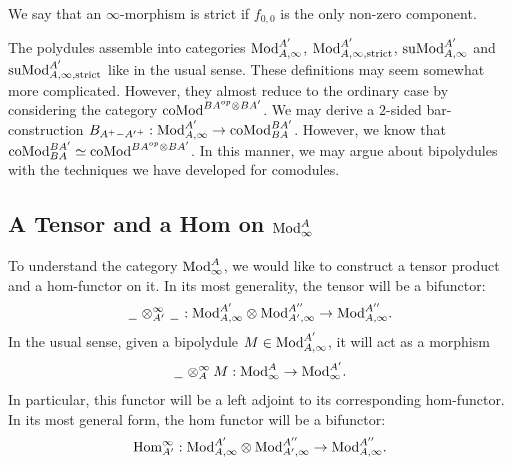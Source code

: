 \documentclass[../thesis.tex]{subfiles}
\begin{document}
            We say that an $\infty$-morphism is strict if $f_{0,0}$ is the only non-zero component.

            The polydules assemble into categories $\tt{Mod}_{A,\infty}^{A'}$, $\tt{Mod}_{A,\infty, \tt{strict}}^{A'}$, $\tt{suMod}_{A,\infty}^{A'}$ and $\tt{suMod}_{A,\infty, \tt{strict}}^{A'}$ like in the usual sense. These definitions may seem somewhat more complicated. However, they almost reduce to the ordinary case by considering the category $\tt{coMod}^{BA^{op}\otimes BA'}$. We may derive a $2$-sided bar-construction $B_{A^+-{A'}^+} : \tt{Mod}_{A,\infty}^{A'} \rightarrow \tt{coMod}^{BA'}_{BA}$. However, we know that $\tt{coMod}_{BA}^{BA'} \simeq \tt{coMod}^{BA^{op}\otimes BA'}$. In this manner, we may argue about bipolydules with the techniques we have developed for comodules.

        \subsection{A Tensor and a Hom on $\tt{Mod}_\infty^A$}

            To understand the category $\tt{Mod}_\infty^A$, we would like to construct a tensor product and a hom-functor on it. In its most generality, the tensor will be a bifunctor:
            \begin{align*}
                \argument \otimes^\infty_{A'} \argument : \tt{Mod}_{A,\infty}^{A'} \otimes \tt{Mod}_{A',\infty}^{A''} \rightarrow \tt{Mod}_{A,\infty}^{A''}\tt{.}
            \end{align*}
            In the usual sense, given a bipolydule $M \in \tt{Mod}_{A,\infty}^{A'}$, it will act as a morphism
            \begin{align*}
                \argument \otimes_A^\infty M : \tt{Mod}_\infty^A \rightarrow \tt{Mod}_\infty^{A'}\tt{.}
            \end{align*}
            In particular, this functor will be a left adjoint to its corresponding hom-functor. In its most general form, the hom functor will be a bifunctor:
            \begin{align*}
                \tt{Hom}^\infty_{A'} : \tt{Mod}_{A,\infty}^{A'}\otimes\tt{Mod}_{A',\infty}^{A''} \rightarrow \tt{Mod}_{A,\infty}^{A''}\tt{.}
            \end{align*}
\end{document}
